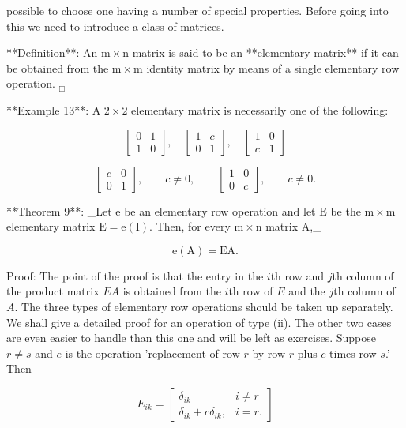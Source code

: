 possible to choose one having a number of special properties. Before going into this we need to introduce a class of matrices.

**Definition**: An \(\mathrm{m}\times\mathrm{n}\) matrix is said to be an **elementary matrix** if it can be obtained from the \(\mathrm{m}\times\mathrm{m}\) identity matrix by means of a single elementary row operation. \({}_{\Box}\)

**Example 13**: A \(2\times 2\) elementary matrix is necessarily one of the following:

\[\begin{bmatrix}0&1\\ 1&0\end{bmatrix},\quad\begin{bmatrix}1&c\\ 0&1\end{bmatrix},\quad\begin{bmatrix}1&0\\ c&1\end{bmatrix}\]

\[\begin{bmatrix}c&0\\ 0&1\end{bmatrix},\quad\quad c\neq 0,\quad\quad\begin{bmatrix}1&0\\ 0&c\end{bmatrix},\quad\quad c\neq 0.\]

**Theorem 9**: _Let \(\mathrm{e}\) be an elementary row operation and let \(\mathrm{E}\) be the \(\mathrm{m}\times\mathrm{m}\) elementary matrix \(\mathrm{E}=\mathrm{e}(\mathrm{I})\). Then, for every \(\mathrm{m}\times\mathrm{n}\) matrix \(\mathrm{A}\),_

\[\mathrm{e}(\mathrm{A})=\mathrm{EA}.\]

Proof: The point of the proof is that the entry in the \(i\)th row and \(j\)th column of the product matrix \(EA\) is obtained from the \(i\)th row of \(E\) and the \(j\)th column of \(A\). The three types of elementary row operations should be taken up separately. We shall give a detailed proof for an operation of type (ii). The other two cases are even easier to handle than this one and will be left as exercises. Suppose \(r\neq s\) and \(e\) is the operation 'replacement of row \(r\) by row \(r\) plus \(c\) times row \(s\).' Then

\[E_{ik}=\begin{bmatrix}\delta_{ik}&i\neq r\\ \delta_{ik}+c\delta_{ik},&i=r.\end{bmatrix}\]

